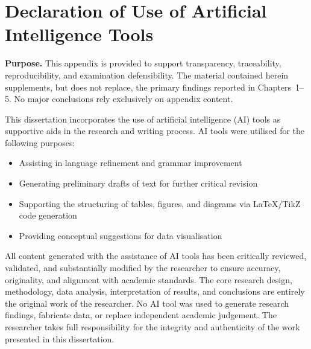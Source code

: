 
\section{Declaration of Use of Artificial Intelligence Tools}


\noindent\textbf{Purpose.} This appendix is provided to support transparency, traceability, reproducibility, and examination defensibility. The material contained herein supplements, but does not replace, the primary findings reported in Chapters~1--5. No major conclusions rely exclusively on appendix content.

\label{app:ai_declaration}

\noindent This dissertation incorporates the use of artificial intelligence (AI) tools as supportive aids in the research and writing process. AI tools were utilised for the following purposes:

\begin{itemize}
    \item Assisting in language refinement and grammar improvement
    \item Generating preliminary drafts of text for further critical revision
    \item Supporting the structuring of tables, figures, and diagrams via LaTeX/TikZ code generation
    \item Providing conceptual suggestions for data visualisation
\end{itemize}

\noindent All content generated with the assistance of AI tools has been critically reviewed, validated, and substantially modified by the researcher to ensure accuracy, originality, and alignment with academic standards. The core research design, methodology, data analysis, interpretation of results, and conclusions are entirely the original work of the researcher. No AI tool was used to generate research findings, fabricate data, or replace independent academic judgement. The researcher takes full responsibility for the integrity and authenticity of the work presented in this dissertation.

